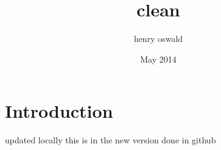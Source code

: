 \documentclass{article}
\title{clean}
\author{henry oswald}
\date{May 2014}
\begin{document}
\maketitle

\section{Introduction}
updated locally
this is in the new version 
done in github
\end{document}
